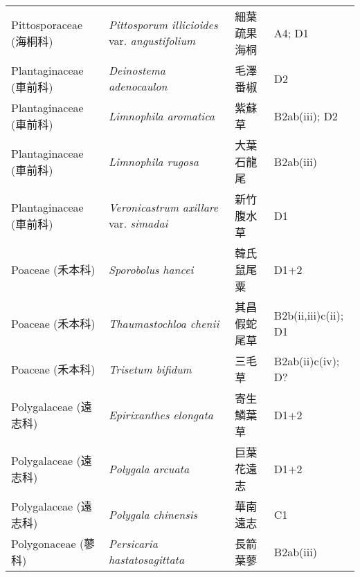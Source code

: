 \begin{longtable}{p{3cm}p{5cm}p{3cm}p{4cm}}
    Pittosporaceae (海桐科) & \textit{Pittosporum illicioides} var. \textit{angustifolium}  & 細葉疏果海桐 & A4; D1 \index{Pittosporum@\textit{Pittosporum}!illicioides@\textit{illicioides}!var. angustifolium@var. \textit{angustifolium}}  \index{細葉疏果海桐} \\
    Plantaginaceae (車前科) & \textit{Deinostema adenocaulon}  & 毛澤番椒 & D2 \index{Deinostema@\textit{Deinostema}!adenocaulon@\textit{adenocaulon}}  \index{毛澤番椒} \\
    Plantaginaceae (車前科) & \textit{Limnophila aromatica}  & 紫蘇草 & B2ab(iii); D2 \index{Limnophila@\textit{Limnophila}!aromatica@\textit{aromatica}}  \index{紫蘇草} \\
    Plantaginaceae (車前科) & \textit{Limnophila rugosa}  & 大葉石龍尾 & B2ab(iii) \index{Limnophila@\textit{Limnophila}!rugosa@\textit{rugosa}}  \index{大葉石龍尾} \\
    Plantaginaceae (車前科) & \textit{Veronicastrum axillare} var. \textit{simadai}  & 新竹腹水草 & D1 \index{Veronicastrum@\textit{Veronicastrum}!axillare@\textit{axillare}!var. simadai@var. \textit{simadai}}  \index{新竹腹水草} \\
    Poaceae (禾本科) & \textit{Sporobolus hancei}  & 韓氏鼠尾粟 & D1+2 \index{Sporobolus@\textit{Sporobolus}!hancei@\textit{hancei}}  \index{韓氏鼠尾粟} \\
    Poaceae (禾本科) & \textit{Thaumastochloa chenii}  & 其昌假蛇尾草 & B2b(ii,iii)c(ii); D1 \index{Thaumastochloa@\textit{Thaumastochloa}!chenii@\textit{chenii}}  \index{其昌假蛇尾草} \\
    Poaceae (禾本科) & \textit{Trisetum bifidum}  & 三毛草 & B2ab(ii)c(iv); D? \index{Trisetum@\textit{Trisetum}!bifidum@\textit{bifidum}}  \index{三毛草} \\
    Polygalaceae (遠志科) & \textit{Epirixanthes elongata}  & 寄生鱗葉草 & D1+2 \index{Epirixanthes@\textit{Epirixanthes}!elongata@\textit{elongata}}  \index{寄生鱗葉草} \\
    Polygalaceae (遠志科) & \textit{Polygala arcuata}  & 巨葉花遠志 & D1+2 \index{Polygala@\textit{Polygala}!arcuata@\textit{arcuata}}  \index{巨葉花遠志} \\
    Polygalaceae (遠志科) & \textit{Polygala chinensis}  & 華南遠志 & C1 \index{Polygala@\textit{Polygala}!chinensis@\textit{chinensis}}  \index{華南遠志} \\
    Polygonaceae (蓼科) & \textit{Persicaria hastatosagittata}  & 長箭葉蓼 & B2ab(iii) \index{Persicaria@\textit{Persicaria}!hastatosagittata@\textit{hastatosagittata}}  \index{長箭葉蓼} \\

\end{longtable}
